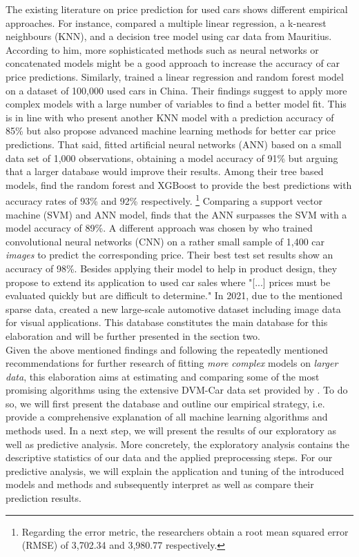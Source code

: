 \documentclass[12pt]{article}
\begin{document}
\noindent The existing literature on price prediction for used cars shows different empirical approaches. For instance, \cite{Gajera2021} compared a multiple linear regression, a k-nearest neighbours (KNN), and a decision tree model using car data from Mauritius. According to him, more sophisticated methods such as neural networks or concatenated models might be a good approach to increase the accuracy of car price predictions. Similarly, \cite{chen2017comparative} trained a linear regression and random forest model on a dataset of 100,000 used cars in China. Their findings suggest to apply more complex models with a large number of variables to find a better model fit. This is in line with \cite{Samruddhi2020} who present another KNN model with a prediction accuracy of 85\% but also propose advanced machine learning methods for better car price predictions. That said, \cite{Karakoç2020} fitted artificial neural networks (ANN) based on a small data set of 1,000 observations, obtaining a model accuracy of 91\% but arguing that a larger database would improve their results. Among their tree based models, \cite{Gajera2021} find the random forest and XGBoost to provide the best predictions with accuracy rates of 93\% and 92\% respectively. \footnote{Regarding the error metric, the researchers obtain a root mean squared error (RMSE) of 3,702.34 and 3,980.77 respectively.} Comparing a support vector machine (SVM) and ANN model, \cite{Bilen2021} finds that the ANN surpasses the SVM with a model accuracy of 89\%. A different approach was chosen by \cite{yang2018ai} who trained convolutional neural networks (CNN) on a rather small sample of 1,400 car \textit{images} to predict the corresponding price. Their best test set results show an accuracy of 98\%. Besides applying their model to help in product design, they propose to extend its application to used car sales where "[...] prices must be evaluated quickly but are difficult to determine." In 2021, due to the mentioned sparse data, \cite{huang2023dvmcar} created a new large-scale automotive dataset including image data for visual applications. This database constitutes the main database for this elaboration and will be further presented in the section two. \\

\noindent Given the above mentioned findings and following the repeatedly mentioned recommendations for further research of fitting \textit{more complex} models on \textit{larger data}, this elaboration aims at estimating and comparing some of the most promising algorithms using the extensive DVM-Car data set provided by \cite{huang2023dvmcar}. To do so, we will first present the database and outline our empirical strategy, i.e. provide a comprehensive explanation of all machine learning algorithms and methods used. In a next step, we will present the results of our exploratory as well as predictive analysis. More concretely, the exploratory analysis contains the descriptive statistics of our data and the applied preprocessing steps. For our predictive analysis, we will explain the application and tuning of the introduced models and methods and subsequently interpret as well as compare their prediction results. \\
\end{document}
